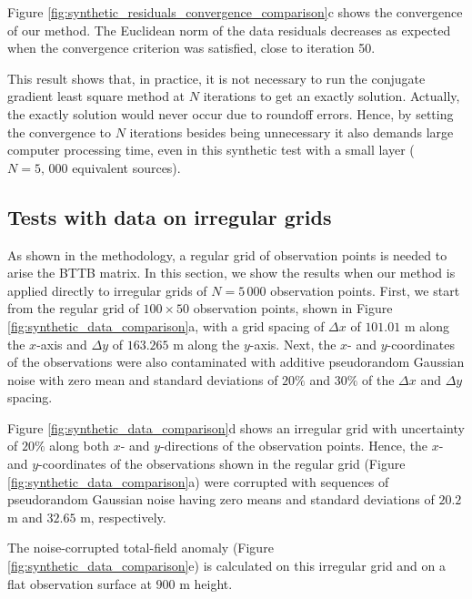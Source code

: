 Figure \ref{fig:synthetic_residuals_convergence_comparison}c shows the convergence of our method. 
The Euclidean norm of the data residuals decreases as expected when the
convergence criterion was satisfied, close to iteration 50. 

This result shows that, in practice, it is not necessary to run the conjugate gradient least square method at $N$ iterations to get an exactly solution.
Actually, the exactly solution  would never occur due to roundoff errors.
Hence, by setting the convergence to  $N$ iterations besides being unnecessary it also demands large computer processing time, even in this synthetic test with a small layer 
($N = 5,\, 000$ equivalent sources). 

\subsection*{Tests with data on irregular grids}

As shown in the methodology, a regular grid of observation points is needed to arise the BTTB matrix. 
In this section, we show the results when our method is applied directly to irregular grids of $N = 5 \, 000$ observation points. 
First, we start from the  regular grid of $100 \times 50$ observation points, shown in Figure 
\ref{fig:synthetic_data_comparison}a,  with a grid spacing of $\Delta x$ of $101.01$ m along the $x$-axis and $\Delta y$ of $163.265$ m along the $y$-axis. 
Next, the $x$- and $y$-coordinates of the observations were also contaminated with additive pseudorandom Gaussian noise with zero mean and standard deviations of $20\%$ and $30\%$ of the $\Delta x$ and $\Delta y$ spacing.


Figure \ref{fig:synthetic_data_comparison}d shows an irregular grid with uncertainty  of $20\%$ along both $x$- and $y$-directions of the observation points. 
Hence, the $x$- and $y$-coordinates of the observations shown in the regular grid (Figure
\ref{fig:synthetic_data_comparison}a)  were corrupted with sequences of pseudorandom Gaussian noise 
having zero means and standard deviations of $20.2$ m and $32.65$ m, respectively.

The noise-corrupted total-field anomaly (Figure \ref{fig:synthetic_data_comparison}e) is calculated 
on this irregular grid and on a flat observation surface at $900$ m height.

